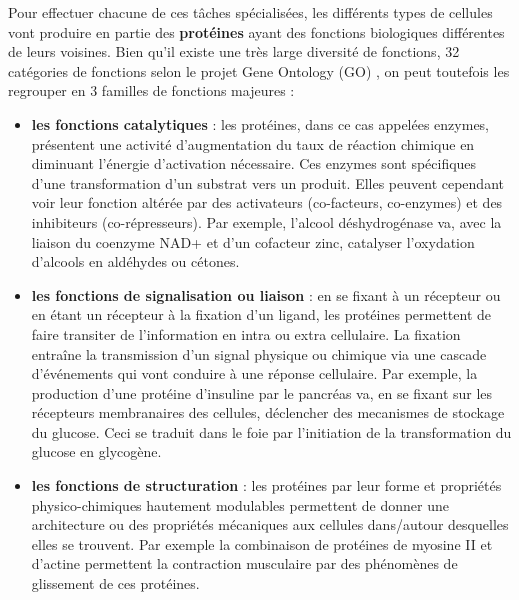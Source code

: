 Pour effectuer chacune de ces tâches spécialisées, les différents types de cellules vont produire en partie des \textbf{protéines} ayant des fonctions biologiques différentes de leurs voisines. Bien qu'il existe une très large diversité de fonctions, 32 catégories de fonctions selon le projet Gene Ontology (\acrshort{GO}) \cite{Ashburner2000}, on peut toutefois les regrouper en 3 familles de fonctions majeures \cite{Mathews2012}:  
\begin{itemize}
    \item \textbf{les fonctions catalytiques} : les protéines, dans ce cas appelées enzymes, présentent une activité d'augmentation du taux de réaction chimique en diminuant l'énergie d'activation nécessaire. Ces enzymes sont spécifiques d'une transformation d'un substrat vers un produit. Elles peuvent cependant voir leur fonction altérée par des activateurs (co-facteurs, co-enzymes) et des inhibiteurs (co-répresseurs). Par exemple, l'alcool déshydrogénase va, avec la liaison du coenzyme NAD+ et d'un cofacteur zinc, catalyser l'oxydation d'alcools en aldéhydes ou cétones.
    \item \textbf{les fonctions de signalisation ou liaison} : en se fixant à un récepteur ou en étant un récepteur à la fixation d'un ligand, les protéines permettent de faire transiter de l'information en intra ou extra cellulaire. La fixation entraîne la transmission d'un signal physique ou chimique via une cascade d'événements qui vont conduire à une réponse cellulaire. Par exemple, la production d'une protéine d'insuline par le pancréas va, en se fixant sur les récepteurs membranaires des cellules, déclencher des \glspl{mecanisme} de stockage du glucose. Ceci se traduit dans le foie par l'initiation de la transformation du glucose en glycogène.
    \item \textbf{les fonctions de structuration} : les protéines par leur forme et propriétés physico-chimiques hautement modulables permettent de donner une architecture ou des propriétés mécaniques aux cellules dans/autour desquelles elles se trouvent. Par exemple la combinaison de protéines de myosine II et d'actine permettent la contraction musculaire par des phénomènes de glissement de ces protéines.
\end{itemize}

